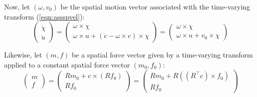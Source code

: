 \documentclass[a4paper]{article}
\begin{document}
Now, let $(\omega, v_0)$ be the spatial motion vector associated with the time-varying transform (\ref{eqn:assspvel}):
\begin{equation}
\left(\begin{array}{c}\dot{\chi}\\ \dot{u}\end{array} \right) =
\left(\begin{array}{c} \omega \times \chi\\ \omega \times u + (\dot{c} - \omega \times c) \times \chi \end{array}\right) =
\left(\begin{array}{c} \omega \times \chi\\ \omega \times u + v_0 \times \chi \end{array}\right)
\end{equation}

Likewise, let $(m, f)$ be a spatial force vector given by a time-varying transform applied to a constant spatial force vector $(m_0, f_0)$:
\begin{equation}
\left(\begin{array}{c}m\\f\end{array}\right) =
\left(\begin{array}{c}R m_0 + c \times (R f_0)\\R f_0\end{array}\right) =
\left(\begin{array}{c}R m_0 + R((R^\top c) \times f_0)\\ R f_0\end{array}\right)
\end{equation}
\end{document}
